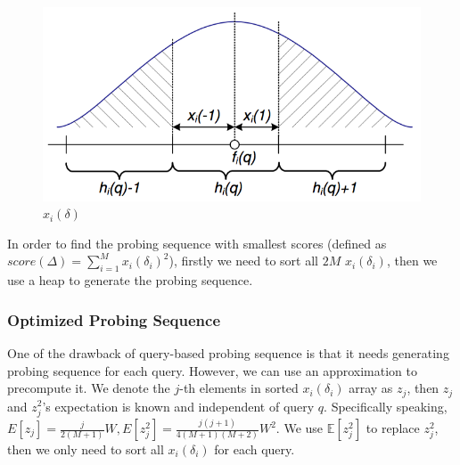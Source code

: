 \begin{figure}[hbt]
\centering
  \includegraphics[width=\columnwidth]{figures/multi_probe_nn.png}
  \caption{$x_i(\delta)$}
  \label{fig:x_i}
\end{figure}

In order to find the probing sequence with smallest scores (defined as $score(\Delta)=\sum_{i=1}^{M}x_i(\delta_i)^2$), firstly we need to sort all $2M$ $x_i(\delta_i)$, then we use a heap to generate the probing sequence.

\subsubsection{Optimized Probing Sequence}

One of the drawback of query-based probing sequence is that it needs generating probing sequence for each query.
However, we can use an approximation to precompute it.
We denote the $j$-th elements in sorted $x_i(\delta_i)$ array  as $z_j$, then $z_j$ and $z_j^2$'s expectation is known and independent of query $q$.
Specifically speaking, $E[z_j]{=}\frac{j}{2(M+1)}W, E[z_j^2]{=}\frac{j(j+1)}{4(M+1)(M+2)}W^2$.
We use $\mathbb{E}[z_j^2]$ to replace $z_j^2$, then we only need to sort all $x_i(\delta_i)$ for each query.